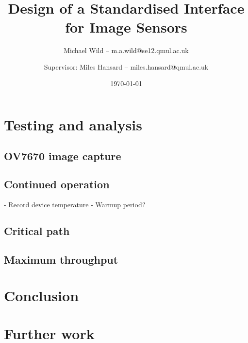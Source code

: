 \documentclass[a4paper,11pt]{report}
\title{Design of a Standardised Interface for Image Sensors}
\author{Michael Wild -- m.a.wild@se12.qmul.ac.uk \and Supervisor: Miles Hansard -- miles.hansard@qmul.ac.uk}
\date{\today}
\begin{document}
  \maketitle
  

  \tableofcontents
  \listoffigures
  \listoftables

  
  
  
  
  

  \chapter{Testing and analysis}
    \section{OV7670 image capture}
    \section{Continued operation}
    - Record device temperature
    - Warmup period?
    \section{Critical path}
    \section{Maximum throughput}
  
  \chapter{Conclusion}




  \chapter{Further work}



  
  \printglossary[type=\acronymtype]
\end{document}
